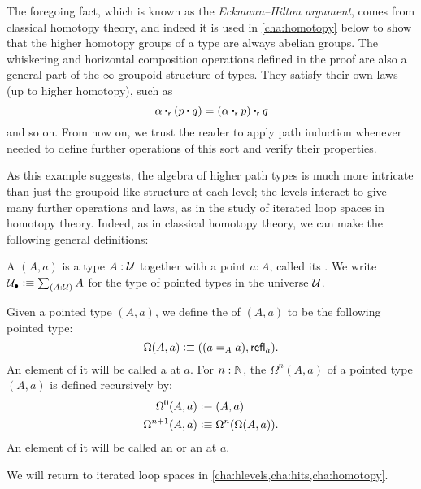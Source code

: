 The foregoing fact, which is known as the \emph{Eckmann--Hilton argument}, comes from classical homotopy theory, and indeed it is used in \cref{cha:homotopy} below to show that the higher homotopy groups of a type are always abelian groups. The whiskering and horizontal composition operations defined in the proof are also a general part of the $\infty$-groupoid structure of types. They satisfy their own laws (up to higher homotopy), such as \[ \alpha \rightwhisker (p\ct q) = (\alpha \rightwhisker p) \rightwhisker q \]
and so on. From now on, we trust the reader to apply path induction whenever needed to define further operations of this sort and verify their properties. 

As this example suggests, the algebra of higher path types is much more intricate than just the groupoid-like structure at each level; the levels interact to give many further operations and laws, as in the study of iterated loop spaces in homotopy theory. Indeed, as in classical homotopy theory, we can make the following general definitions: 

\begin{defn} \label{def:pointedtype}
A 
%
%
$(A,a)$ is a type $A:\type$ together with a point $a:A$, called its .
%
We write $\pointed{\type} \defeq \sm{A:\type} A$ for the type of pointed types in the universe $\type$.
\end{defn}

\begin{defn} \label{def:loopspace}
Given a pointed type $(A,a)$, we define the 
%
of $(A,a)$ to be the following pointed type:
\[\Omega(A,a)\defeq ((\id[A]aa),\refl a).\]
An element of it will be called a  at $a$.
For $n:\N$, the  $\Omega^{n}(A,a)$
%
%
of a pointed type $(A,a)$ is defined recursively by:
\begin{align*}
\Omega^0(A,a)&\defeq(A,a)\\
\Omega^{n+1}(A,a)&\defeq\Omega^n(\Omega(A,a)).
\end{align*}
An element of it will be called an 
%
%
or an 
%
%
at $a$.
\end{defn}

We will return to iterated loop spaces in \cref{cha:hlevels,cha:hits,cha:homotopy}. %
%